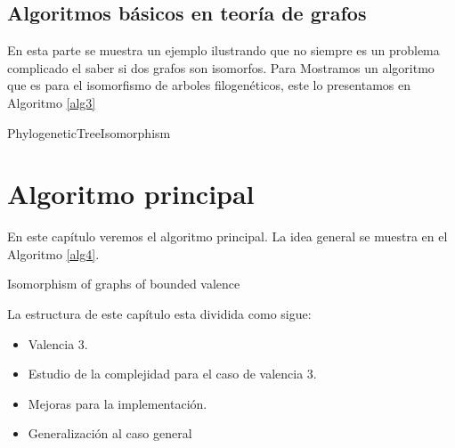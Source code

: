 \documentclass[12pt,a4paper]{book}
\theoremstyle{plain}
\theoremstyle{definition}
\theoremstyle{remark}
\begin{document}
\begin{center}
\subsection*{Algoritmos básicos en teoría de grafos}
En esta parte se muestra un ejemplo ilustrando que no siempre es un problema complicado el saber si dos grafos son isomorfos. Para 
Mostramos un algoritmo que es  para el isomorfismo de arboles filogenéticos, este  lo presentamos  en Algoritmo \ref{alg3}


\begin{algorithm}\label{alg3}\hypertarget{alg3}{}
 
\KwData{}
\caption{PhylogeneticTreeIsomorphism}
\end{algorithm}

\section*{Algoritmo principal}
En este capítulo veremos el algoritmo principal. La idea general se muestra  en el Algoritmo \ref{alg4}.

\begin{algorithm}\label{alg4}\hypertarget{alg4}{}
\caption{Isomorphism of graphs of bounded valence}

\end{algorithm}

La estructura de este capítulo esta dividida como sigue:
\begin{itemize}
 \item Valencia 3.
 \item Estudio de la complejidad para el caso de valencia 3.
 \item Mejoras para la implementación.
 \item Generalización al caso general
\end{itemize}

\end{center}
\end{document}
